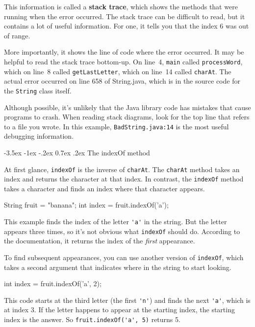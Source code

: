 \documentclass[12pt]{book}
\makeatletter
\theoremstyle{exercise}
\newcommand{\java}[1]{\verb"#1"}
\renewcommand{\section}{\@startsection {section}{1}{\z@}%
    {-3.5ex \@plus -1ex \@minus -.2ex}%
    {0.7ex \@plus.2ex}%
    {\normalfont\Large\bfseries}}
\newcommand{\java}[1]{\lstinline{#1}} %
\makeatother
\begin{document}

This information is called a {\bf stack trace}, which shows the methods that were running when the error occurred.
The stack trace can be difficult to read, but it contains a lot of useful information.
For one, it tells you that the index 6 was out of range.

More importantly, it shows the line of code where the error occurred.
It may be helpful to read the stack trace bottom-up.
On line~4, \java{main} called \java{processWord}, which on line~8 called \java{getLastLetter}, which on line~14 called \java{charAt}.
The actual error occurred on line 658 of String.java, which is in the source code for the \java{String} class itself.

Although possible, it's unlikely that the Java library code has mistakes that cause programs to crash.
When reading stack diagrams, look for the top line that refers to a file you wrote.
In this example, \java{BadString.java:14} is the most useful debugging information.


\section{The indexOf method}

At first glance, \java{indexOf} is the inverse of \java{charAt}.
The \java{charAt} method takes an index and returns the character at that index.
In contrast, the \java{indexOf} method takes a character and finds an index where that character appears.

\begin{code}
    String fruit = "banana";
    int index = fruit.indexOf('a');
\end{code}

This example finds the index of the letter \java{'a'} in the string.
But the letter appears three times, so it's not obvious what \java{indexOf} should do.
According to the documentation, it returns the index of the {\em first} appearance.

To find subsequent appearances, you can use another version of \java{indexOf}, which takes a second argument that indicates where in the string to start looking.

\begin{code}
    int index = fruit.indexOf('a', 2);
\end{code}

This code starts at the third letter (the first \java{'n'}) and finds the next \java{'a'}, which is at index 3.
If the letter happens to appear at the starting index, the starting index is the answer.
So \java{fruit.indexOf('a', 5)} returns 5.
\end{document}
